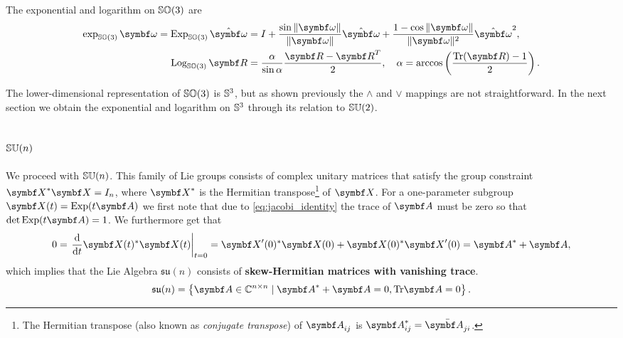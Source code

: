 \begin{important}
  The exponential and logarithm on ${\mathbb{SO}(3)}$ are
  \begin{subequations}
    \begin{align}
      \exp_\SOthree \bomega = \Exp_\SOthree \hat {\bomega} & = I + \frac{\sin \| \bomega \|}{\|\bomega \|} \hat {\bomega} + \frac{1 - \cos \| \bomega \|}{\| \bomega \|^2} \hat {\bomega}^2, \\
      \Log_\SOthree \bR                                    & = \frac{\alpha}{\sin \alpha} \frac{\bR - \bR^T}{2}, \quad \alpha = \arccos \left( \frac{\tr(\bR) - 1}{2} \right).
    \end{align}
  \end{subequations}
\end{important}
The lower-dimensional representation of ${\mathbb{SO}(3)}$ is ${\mathbb{S}^3}$, but as shown previously the $\wedge$ and $\vee$ mappings are not straightforward. In the next section we obtain the exponential and logarithm on ${\mathbb{S}^3}$ through its relation to ${\mathbb{SU}(2)}$.

\subsection{\texorpdfstring{${\mathbb{SU}(n)}$}{SU(n)}}

We proceed with ${\mathbb{SU}(n)}$. This family of Lie groups consists of complex unitary matrices that satisfy the group constraint $\X^* \X = I_n$, where $\X^*$ is the Hermitian transpose\footnote{The Hermitian transpose (also known as \emph{conjugate transpose}) of $\A_{ij}$ is $\A_{ij}^* = \bar {\A_{ji}}$.} of $\X$. For a one-parameter subgroup $\X(t) = \Exp(t \A)$ we first note that due to \eqref{eq:jacobi_identity} the trace of $\A$ must be zero so that $\det \Exp(t \A) = 1$. We furthermore get that
\begin{equation}
  0 = \left. \frac{\mathrm{d}}{\mathrm{d} t} \X(t)^* \X(t) \right|_{t=0} = \X'(0)^* \X(0) + \X(0)^* \X'(0) = \A^* + \A,
\end{equation}
which implies that the Lie Algebra $\mathfrak{su}(n)$ consists of \textbf{skew-Hermitian matrices with vanishing trace}.
\begin{equation}
  \mathfrak{su}(n) = \left\{ \A \in \mathbb{C}^{n \times n} \mid \A^* + \A = 0, \tr \A = 0 \right\}.
\end{equation}

